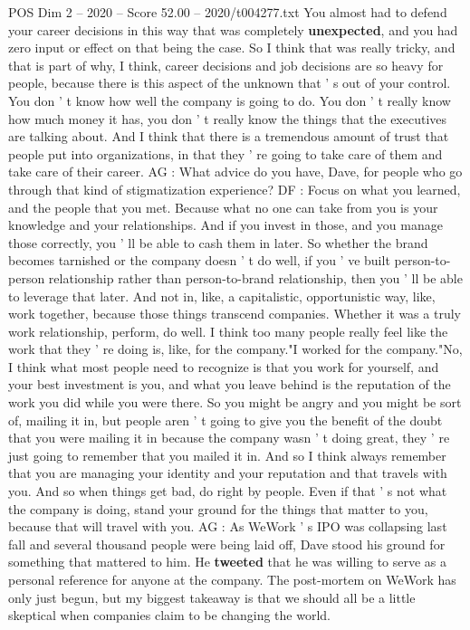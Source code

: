 \begin{textsample}{POS Dim 2 – 2020 – Score 52.00 – 2020/t004277.txt}
You almost had to defend your career decisions in this way that was completely \textbf{unexpected}, and you had zero input or effect on that being the case.
So I think that was really tricky, and that is part of why, I think, career decisions and job decisions are so heavy for people, because there is this aspect of the unknown that ' s out of your control.
You don ' t know how well the company is going to do.
You don ' t really know how much money it has, you don ' t really know the things that the executives are talking about.
And I think that there is a tremendous amount of trust that people put into organizations, in that they ' re going to take care of them and take care of their career.
AG : What advice do you have, Dave, for people who go through that kind of stigmatization experience?
DF : Focus on what you learned, and the people that you met.
Because what no one can take from you is your knowledge and your relationships.
And if you invest in those, and you manage those correctly, you ' ll be able to cash them in later.
So whether the brand becomes tarnished or the company doesn ' t do well, if you ' ve built person-to-person relationship rather than person-to-brand relationship, then you ' ll be able to leverage that later.
And not in, like, a capitalistic, opportunistic way, like, work together, because those things transcend companies.
Whether it was a truly work relationship, perform, do well.
I think too many people really feel like the work that they ' re doing is, like, for the company."I worked for the company."No, I think what most people need to recognize is that you work for yourself, and your best investment is you, and what you leave behind is the reputation of the work you did while you were there.
So you might be angry and you might be sort of, mailing it in, but people aren ' t going to give you the benefit of the doubt that you were mailing it in because the company wasn ' t doing great, they ' re just going to remember that you mailed it in.
And so I think always remember that you are managing your identity and your reputation and that travels with you.
And so when things get bad, do right by people.
Even if that ' s not what the company is doing, stand your ground for the things that matter to you, because that will travel with you.
AG : As WeWork ' s IPO was collapsing last fall and several thousand people were being laid off, Dave stood his ground for something that mattered to him.
He \textbf{tweeted} that he was willing to serve as a personal reference for anyone at the company.
The post-mortem on WeWork has only just begun, but my biggest takeaway is that we should all be a little skeptical when companies claim to be changing the world.

\end{textsample}
